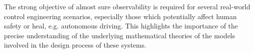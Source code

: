 \documentclass[conference]{IEEEtran}
\begin{document}
	The strong objective of almost sure observability is required for several real-world control engineering scenarios, especially those which potentially affect human safety or heal, e.g.
	autonomous driving. This highlights the importance of the precise understanding of the underlying mathematical theories of the models involved in the design process of these systems.

		



\end{document}
